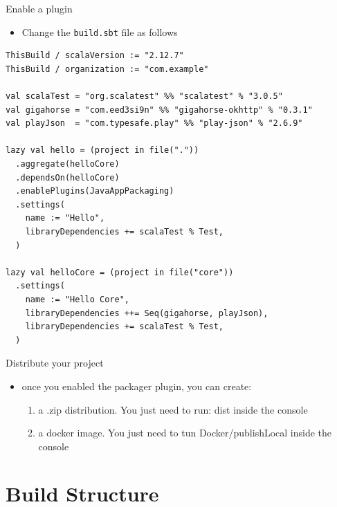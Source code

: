 \documentclass[presentation, aspectratio=169]{beamer}
\begin{document}
\begin{frame}[label={sec:orga1860b4},fragile]{Enable a plugin}
 \begin{itemize}
\item Change the \texttt{build.sbt} file as follows
\end{itemize}
\begin{verbatim}
ThisBuild / scalaVersion := "2.12.7"
ThisBuild / organization := "com.example"

val scalaTest = "org.scalatest" %% "scalatest" % "3.0.5"
val gigahorse = "com.eed3si9n" %% "gigahorse-okhttp" % "0.3.1"
val playJson  = "com.typesafe.play" %% "play-json" % "2.6.9"

lazy val hello = (project in file("."))
  .aggregate(helloCore)
  .dependsOn(helloCore)
  .enablePlugins(JavaAppPackaging)
  .settings(
    name := "Hello",
    libraryDependencies += scalaTest % Test,
  )

lazy val helloCore = (project in file("core"))
  .settings(
    name := "Hello Core",
    libraryDependencies ++= Seq(gigahorse, playJson),
    libraryDependencies += scalaTest % Test,
  )
\end{verbatim}
\end{frame}

\begin{frame}[label={sec:org091dc72}]{Distribute your project}
\begin{itemize}
\item once you enabled the packager plugin, you can create:
\begin{enumerate}
\item a .zip distribution. You just need to run: \alert{dist} inside the console
\item a docker image. You just need to tun \alert{Docker/publishLocal} inside the console
\end{enumerate}
\end{itemize}
\end{frame}


\section{Build Structure}
\label{sec:orga8ced04}
\end{document}
